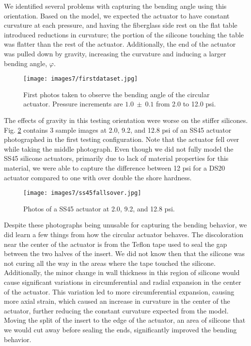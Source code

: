 We identified several problems with capturing the bending angle using this orientation. Based on the model, we expected the actuator to have constant curvature at each pressure, and having the fiberglass side rest on the flat table introduced reductions in curvature; the portion of the silicone touching the table was flatter than the rest of the actuator. Additionally, the end of the actuator was pulled down by gravity, increasing the curvature and inducing a larger bending angle, $\varphi$. 

\begin{figure}[h]
    \centering
     \texttt{[image: images7/firstdataset.jpg]}
    \caption{First photos taken to observe the bending angle of the circular actuator. Pressure increments are $1.0~\pm~0.1$ from 2.0 to 12.0 psi.}
    \label{fig:firstdataset}
\end{figure}

\clearpage

The effects of gravity in this testing orientation were worse on the stiffer silicones. Fig. \ref{fig:ss45fallsover} contains 3 sample images at 2.0, 9.2, and 12.8 psi of an SS45 actuator photographed in the first testing configuration. Note that the actuator fell over while taking the middle photograph. Even though we did not fully model the SS45 silicone actuators, primarily due to lack of material properties for this material, we were able to capture the difference between 12 psi for a DS20 actuator compared to one with over double the shore hardness. 

\begin{figure}[h]
    \centering
     \texttt{[image: images7/ss45fallsover.jpg]}
    \caption{Photos of a SS45 actuator at 2.0, 9.2, and 12.8 psi.}
    \label{fig:ss45fallsover}
\end{figure}

Despite these photographs being unusable for capturing the bending behavior, we did learn a few things from how the circular actuator behaves. The discoloration near the center of the actuator is from the Teflon tape used to seal the gap between the two halves of the insert. We did not know then that the silicone was not curing all the way in the areas where the tape touched the silicone. Additionally, the minor change in wall thickness in this region of silicone would cause significant variations in circumferential and radial expansion in the center of the actuator. This variation led to more circumferential expansion, causing more axial strain, which caused an increase in curvature in the center of the actuator, further reducing the constant curvature expected from the model. Moving the split of the insert to the edge of the actuator, an area of silicone that we would cut away before sealing the ends, significantly improved the bending behavior. 

